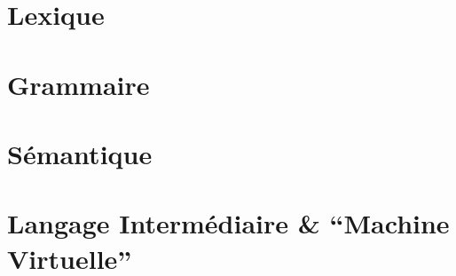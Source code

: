 \documentclass[10pt]{article}
\begin{document}
\section{Lexique}


\pagebreak

\section{Grammaire}


\pagebreak

\section{Sémantique}


\section{Langage Intermédiaire \& ``Machine Virtuelle''}

\end{document}
